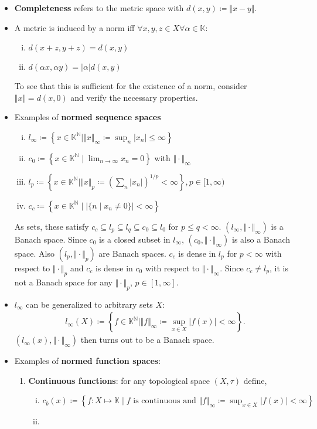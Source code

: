 \documentclass[10pt,a4paper]{article}
\theoremstyle{definition}
\theoremstyle{cor}
\theoremstyle{theorem}
\theoremstyle{lemma}
\theoremstyle{example}
\newcommand{\norm}[1]{\Vert #1 \Vert}
\begin{document}
\begin{itemize}
\item \textbf{Completeness} refers to the metric space with $d(x, y) \coloneqq \norm{x - y}$.
\item A metric is induced by a norm iff $\forall x,y,z \in X \forall\alpha\in\mathbb{K}:$
\begin{enumerate}[(i)]
\item $d(x+z, y+z) = d(x, y)$
\item $d(\alpha x, \alpha y) = |\alpha| d(x, y)$
\end{enumerate}
To see that this is sufficient for the existence of a norm, consider $\norm{x} = d(x , 0)$ and verify the necessary properties. 
\item Examples of \textbf{normed sequence spaces}
\begin{enumerate}[(i)]
\item $l_{\infty} \coloneqq \left\{ x \in \mathbb{K}^{\mathbb{N}} \mid \norm{x}_{\infty} \coloneqq \sup_{n} |x_n| \leq \infty \right\}$
\item $c_0 \coloneqq \left\{ x \in \mathbb{K}^{\mathbb{N}} \mid \lim_{n \rightarrow \infty} x_n = 0 \right\}$ with $\norm{\cdot}_{\infty}$
\item $l_{p} \coloneqq \left\{ x \in \mathbb{K}^{\mathbb{N}} \mid \norm{x}_p \coloneqq \left( \sum_n |x_n| \right)^{1/p} <\infty \right\}, p\in[1, \infty)$
\item $c_c \coloneqq \left\{ x \in \mathbb{K}^{\mathbb{N}} \mid \left| \{n \mid x_n \neq 0\}\right| < \infty \right\} $
\end{enumerate}
As sets, these satisfy $c_c \subseteq l_p \subseteq l_q \subseteq c_0 \subseteq l_0$ for $p \leq q < \infty$. $\left( l_{\infty}, \norm{\cdot}_{\infty} \right)$ is a Banach space. Since $c_0$ is a closed subset in $l_\infty$, $\left(c_0, \norm{\cdot}_{\infty}\right)$ is also a Banach space. Also $\left(l_p, \norm{\cdot}_{p}\right)$ are Banach spaces. $c_c$ is dense in $l_p$ for $p < \infty$ with respect to $\norm{\cdot}_p$ and $c_c$ is dense in $c_0$ with respect to $\norm{\cdot}_{\infty}$. Since $c_c \neq l_p$, it is not a Banach space for any $\norm{\cdot}_p$, $p\in[1, \infty]$.
\item $l_\infty$ can be generalized to arbitrary sets $X$: 
\begin{align*}
l_\infty(X) \coloneqq \left\{ f \in \mathbb{K}^{\mathbb{N}} \mid \norm{f}_\infty \coloneqq \sup_{x \in X} |f(x)| < \infty\right\}.
\end{align*}
$\left(l_\infty(x), \norm{\cdot}_\infty\right)$  then turns out to be a Banach space.
\item Examples of \textbf{normed function spaces}:
\begin{enumerate}[(1)]
\item \textbf{Continuous functions}: for any topological space $(X, \tau)$ define,
\begin{enumerate}[(i)]
\item $c_b(x) \coloneqq \left\{ f : X \mapsto \mathbb{K} \mid f \text{ is continuous and } \norm{f}_{\infty} \coloneqq \sup_{x \in X} |f(x)| < \infty \right\}$
\item 
\end{enumerate}

\end{enumerate}
\end{itemize}
\end{document}
